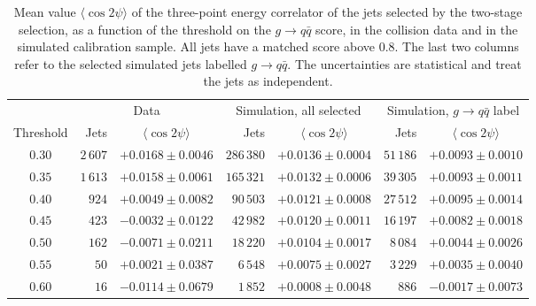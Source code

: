   \begin{table}[htbp]
    \centering
    \caption{Mean value $\langle \cos 2\psi \rangle$ of the three-point energy
    correlator of the jets selected by the two-stage selection, as a function of
    the threshold on the $g \to q\bar{q}$ score, in the collision data and in the
    simulated calibration sample. All jets have a matched score above $0.8$. The
    last two columns refer to the selected simulated jets labelled
    $g \to q\bar{q}$. The uncertainties are statistical and treat the jets as
    independent.}
    \label{tab:eeec-threshold}
    \small
    \begin{tabular}{crcrcrc}
      \toprule
      & \multicolumn{2}{c}{Data}
      & \multicolumn{2}{c}{Simulation, all selected}
      & \multicolumn{2}{c}{Simulation, $g \to q\bar{q}$ label} \\
      \cmidrule(lr){2-3} \cmidrule(lr){4-5} \cmidrule(l){6-7}
      Threshold & Jets & $\langle \cos 2\psi \rangle$
                & Jets & $\langle \cos 2\psi \rangle$
                & Jets & $\langle \cos 2\psi \rangle$ \\
      \midrule
      $0.30$ & $2\,607$ & $+0.0168 \pm 0.0046$ & $286\,380$ & $+0.0136 \pm 0.0004$ & $51\,186$ & $+0.0093 \pm 0.0010$ \\
      $0.35$ & $1\,613$ & $+0.0158 \pm 0.0061$ & $165\,321$ & $+0.0132 \pm 0.0006$ & $39\,305$ & $+0.0093 \pm 0.0011$ \\
      $0.40$ & $924$    & $+0.0049 \pm 0.0082$ & $90\,503$  & $+0.0121 \pm 0.0008$ & $27\,512$ & $+0.0095 \pm 0.0014$ \\
      $0.45$ & $423$    & $-0.0032 \pm 0.0122$ & $42\,982$  & $+0.0120 \pm 0.0011$ & $16\,197$ & $+0.0082 \pm 0.0018$ \\
      $0.50$ & $162$    & $-0.0071 \pm 0.0211$ & $18\,220$  & $+0.0104 \pm 0.0017$ & $8\,084$  & $+0.0044 \pm 0.0026$ \\
      $0.55$ & $50$     & $+0.0021 \pm 0.0387$ & $6\,548$   & $+0.0075 \pm 0.0027$ & $3\,229$  & $+0.0035 \pm 0.0040$ \\
      $0.60$ & $16$     & $-0.0114 \pm 0.0679$ & $1\,852$   & $+0.0008 \pm 0.0048$ & $886$     & $-0.0017 \pm 0.0073$ \\
      \bottomrule
    \end{tabular}
  \end{table}
